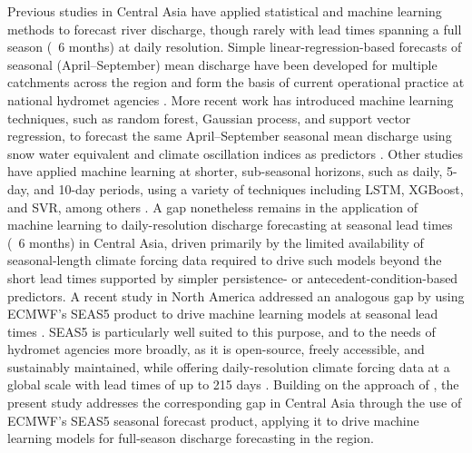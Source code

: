 \documentclass[review,12pt,authoryear]{elsarticle}
\begin{document}
Previous studies in Central Asia have applied statistical and machine learning methods to forecast river discharge, though rarely with lead times spanning a full season (~6 months) at daily resolution. Simple linear-regression-based forecasts of seasonal (April–September) mean discharge have been developed for multiple catchments across the region and form the basis of current operational practice at national hydromet agencies \citep{apel2018}. More recent work has introduced machine learning techniques, such as random forest, Gaussian process, and support vector regression, to forecast the same April–September seasonal mean discharge using snow water equivalent and climate oscillation indices as predictors \citep{umirbekov2025}. Other studies have applied machine learning at shorter, sub-seasonal horizons, such as daily, 5-day, and 10-day periods, using a variety of techniques including LSTM, XGBoost, and SVR, among others \citep{ji2021, abdoulhalik2024, hunziker2026}. A gap nonetheless remains in the application of machine learning to daily-resolution discharge forecasting at seasonal lead times (~6 months) in Central Asia, driven primarily by the limited availability of seasonal-length climate forcing data required to drive such models beyond the short lead times supported by simpler persistence- or antecedent-condition-based predictors. A recent study in North America addressed an analogous gap by using ECMWF's SEAS5 product to drive machine learning models at seasonal lead times \citep{swiftlapointe2025}. SEAS5 is particularly well suited to this purpose, and to the needs of hydromet agencies more broadly, as it is open-source, freely accessible, and sustainably maintained, while offering daily-resolution climate forcing data at a global scale with lead times of up to 215 days \citep{copernicus2018}. Building on the approach of \citet{swiftlapointe2025}, the present study addresses the corresponding gap in Central Asia through the use of ECMWF's SEAS5 seasonal forecast product, applying it to drive machine learning models for full-season discharge forecasting in the region.
\end{document}
